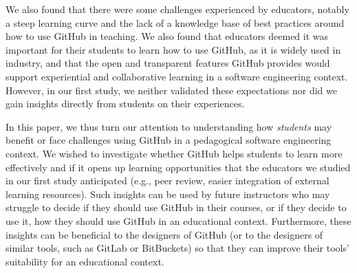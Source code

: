  We also found that there were some challenges experienced by educators, notably a steep learning curve and the lack of a knowledge base of best practices around how to use GitHub in teaching.  We also found that educators deemed it was important for their students to learn how to use GitHub, as it is widely used in industry, and that the open and transparent features GitHub provides would support experiential and collaborative learning in a software engineering context. However, in our first study, we neither validated these expectations nor did we gain insights directly from students on their experiences.

In this paper, we thus turn our attention to understanding how \emph{students} may benefit or face challenges using GitHub in a pedagogical software engineering context. We wished to investigate whether GitHub helps students to learn more effectively and if it opens up learning opportunities that the educators we studied in our first study anticipated (e.g., peer review, easier integration of external learning resources). Such insights can be used by future instructors who may struggle to decide if they should use GitHub in their courses, or if they decide to use it, how they should use GitHub in an educational context. Furthermore, these insights can be beneficial to the designers of GitHub (or to the designers of similar tools, such as GitLab or BitBuckets) so that they can improve their tools' suitability for an educational context.





